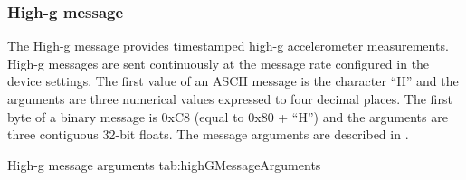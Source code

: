 \begingroup
    \def\tempNameA{Quaternion W element}
    \def\tempNameB{Quaternion X element}
    \def\tempNameC{Quaternion Y element}
    \def\tempNameD{Quaternion Z element}
    \def\tempNameE{Earth acceleration X axis}
    \def\tempNameF{Earth acceleration Y axis}
    \def\tempNameG{Earth acceleration Z axis}
    \def\tempValueA{1}
    \def\tempValueB{0}
    \def\tempValueC{0}
    \def\tempValueD{0}
    \def\tempValueE{0}
    \def\tempValueF{0}
    \def\tempValueG{0}
    \def\tempAsciiFirst{E}
    \def\tempAsciiA{1.0000}
    \def\tempAsciiB{0.0000}
    \def\tempAsciiC{0.0000}
    \def\tempAsciiD{0.0000}
    \def\tempAsciiE{0.0000}
    \def\tempAsciiF{0.0000}
    \def\tempAsciiG{0.0000}
    \def\tempBinaryFirst{C5}
    \def\tempBinaryA{00 00 80 3F}
    \def\tempBinaryB{00 00 00 00}
    \def\tempBinaryC{00 00 00 00}
    \def\tempBinaryD{00 00 00 00}
    \def\tempBinaryE{00 00 00 00}
    \def\tempBinaryF{00 00 00 00}
    \def\tempBinaryG{00 00 00 00}
    \dataMessageExample
\endgroup

\subsubsection{High-g message}

The High-g message provides timestamped high-g accelerometer measurements.  High-g messages are sent continuously at the message rate configured in the device settings.  The first value of an \ac{ASCII} message is the character \enquote{H} and the arguments are three numerical values expressed to four decimal places.  The first byte of a binary message is 0xC8 (equal to 0x80 + \enquote{H}) and the arguments are three contiguous 32-bit floats.  The message arguments are described in .

\begingroup
    \def\tempArgumentA{High-g accelerometer X axis in g}
    \def\tempArgumentB{High-g accelerometer Y axis in g}
    \def\tempArgumentC{High-g accelerometer Z axis in g}
    \dataMessageTable
    {High-g message arguments}
    {tab:highGMessageArguments}
\endgroup

\begingroup
    \def\tempNameA{High-g accelerometer X axis}
    \def\tempNameB{High-g accelerometer Y axis}
    \def\tempNameC{High-g accelerometer Z axis}
    \def\tempValueA{0}
    \def\tempValueB{0}
    \def\tempValueC{1}
    \def\tempAsciiFirst{H}
    \def\tempAsciiA{0.0000}
    \def\tempAsciiB{0.0000}
    \def\tempAsciiC{1.0000}
    \def\tempBinaryFirst{C8}
    \def\tempBinaryA{00 00 00 00}
    \def\tempBinaryB{00 00 00 00}
    \def\tempBinaryC{00 00 80 3F}
    \dataMessageExample
\endgroup


